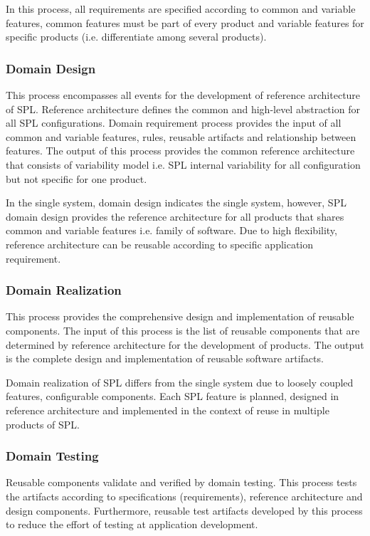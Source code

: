 In this process, all requirements are specified according to common and variable features, common features must be part of every product and variable features for specific products (i.e. differentiate among several products).

\subsubsection{Domain Design}

This process encompasses all events for the development of reference architecture of SPL. Reference architecture defines the common and high-level abstraction for all SPL configurations. Domain requirement process provides the input of all common and variable features, rules, reusable artifacts and relationship between features. The output of this process provides the common reference architecture that consists of variability model i.e. SPL internal variability for all configuration but not specific for one product.

In the single system, domain design indicates the single system, however, SPL domain design provides the reference architecture for all products that shares common and variable features i.e. family of software. Due to high flexibility, reference architecture can be reusable according to specific application requirement.

\subsubsection{Domain Realization}

This process provides the comprehensive design and implementation of reusable components. The input of this process is the list of reusable components that are determined by reference architecture for the development of products. The output is the complete design and implementation of reusable software artifacts.

Domain realization of SPL differs from the single system due to loosely coupled features, configurable components. Each SPL feature is planned, designed in reference architecture and implemented in the context of reuse in multiple products of SPL.  

\subsubsection{Domain Testing}

Reusable components validate and verified by domain testing. This process tests the artifacts according to specifications (requirements), reference architecture and design components. Furthermore, reusable test artifacts developed by this process to reduce the effort of testing at application development. 

